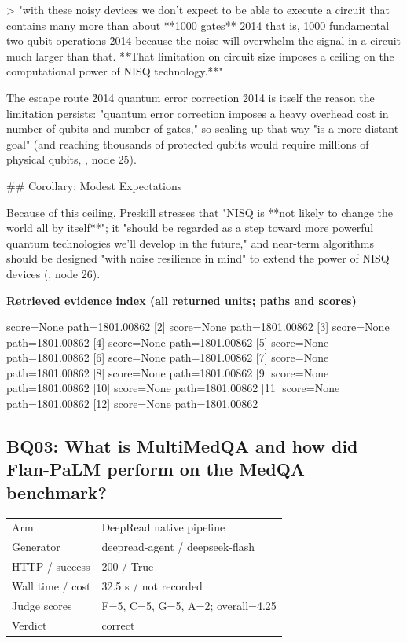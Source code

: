 \documentclass[10pt]{article}
\begin{document}
\begin{AnswerText}
> "with these noisy devices we don't expect to be able to execute a circuit that contains many more than about **1000 gates** \u2014 that is, 1000 fundamental two-qubit operations \u2014 because the noise will overwhelm the signal in a circuit much larger than that. **That limitation on circuit size imposes a ceiling on the computational power of NISQ technology.**"

The escape route \u2014 quantum error correction \u2014 is itself the reason the limitation persists: "quantum error correction imposes a heavy overhead cost in number of qubits and number of gates," so scaling up that way "is a more distant goal" (and reaching thousands of protected qubits would require millions of physical qubits, , node 25).

## Corollary: Modest Expectations

Because of this ceiling, Preskill stresses that "NISQ is **not likely to change the world all by itself**"; it "should be regarded as a step toward more powerful quantum technologies we'll develop in the future," and near-term algorithms should be designed "with noise resilience in mind" to extend the power of NISQ devices (, node 26).
\end{AnswerText}

\textbf{Retrieved evidence index (all returned units; paths and scores) }
\begin{EvidenceText}
[1] score=None path=1801.00862
[2] score=None path=1801.00862
[3] score=None path=1801.00862
[4] score=None path=1801.00862
[5] score=None path=1801.00862
[6] score=None path=1801.00862
[7] score=None path=1801.00862
[8] score=None path=1801.00862
[9] score=None path=1801.00862
[10] score=None path=1801.00862
[11] score=None path=1801.00862
[12] score=None path=1801.00862
\end{EvidenceText}
\subsection{BQ03: What is MultiMedQA and how did Flan-PaLM perform on the MedQA benchmark?}
\begin{tabular}{@{}ll@{}}
Arm & DeepRead native pipeline\\
Generator & deepread-agent / deepseek-flash\\
HTTP / success & 200 / True\\
Wall time / cost & 32.5 s / not recorded\\
Judge scores & F=5, C=5, G=5, A=2; overall=4.25\\
Verdict & correct\\
\end{tabular}
\end{document}
